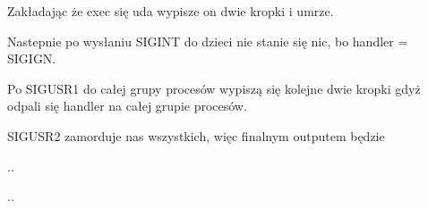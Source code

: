 Zakładając że exec się uda wypisze on dwie kropki i umrze.

Nastepnie po wysłaniu SIGINT do dzieci nie stanie się nic, bo handler = SIGIGN.

Po SIGUSR1 do całej grupy procesów wypiszą się kolejne dwie kropki gdyż odpali się handler na całej grupie procesów.

SIGUSR2 zamorduje nas wszystkich, więc finalnym outputem będzie

..

..
